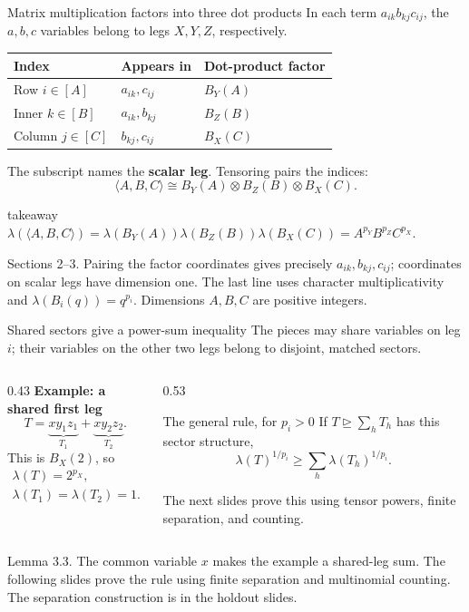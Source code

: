 \documentclass[aspectratio=169,11pt]{beamer}
\newcommand{\degen}{\unrhd}
\newcommand{\cmm}[3]{\langle #1,#2,#3\rangle}
\newcommand{\source}[1]{\vfill\par{\fontsize{7.5}{9}\selectfont\color{muted}#1\par}}
\newcommand{\takeaway}[1]{\begin{beamercolorbox}[sep=0.65em,wd=\linewidth]{takeaway}#1\end{beamercolorbox}}
\begin{document}
\begin{frame}{Matrix multiplication factors into three dot products}
  In each term $a_{ik}b_{kj}c_{ij}$, the $a,b,c$ variables belong to
  legs $X,Y,Z$, respectively.
  \begin{center}
    \renewcommand{\arraystretch}{1.15}
    \begin{tabular}{@{}lll@{}}
      \toprule
      Index & Appears in & Dot-product factor\\
      \midrule
      Row $i\in[A]$ & $a_{ik},c_{ij}$ & $B_Y(A)$\\
      Inner $k\in[B]$ & $a_{ik},b_{kj}$ & $B_Z(B)$\\
      Column $j\in[C]$ & $b_{kj},c_{ij}$ & $B_X(C)$\\
      \bottomrule
    \end{tabular}
  \end{center}
  The subscript names the \textbf{scalar leg}. Tensoring pairs the indices:
  \[
    \cmm{A}{B}{C}\cong B_Y(A)\otimes B_Z(B)\otimes B_X(C).
  \]
  \takeaway{$\displaystyle
    \lambda(\cmm{A}{B}{C})
      =\lambda(B_Y(A))\lambda(B_Z(B))\lambda(B_X(C))
      =A^{p_Y}B^{p_Z}C^{p_X}.
  $}
  \source{Sections 2--3. Pairing the factor coordinates gives precisely
  $a_{ik},b_{kj},c_{ij}$; coordinates on scalar legs have dimension one.
  The last line uses character multiplicativity and $\lambda(B_i(q))=q^{p_i}$.
  Dimensions $A,B,C$ are positive integers.}
\end{frame}

\begin{frame}{Shared sectors give a power-sum inequality}
  The pieces may share variables on leg $i$; their variables on the other
  two legs belong to disjoint, matched sectors.
  \medskip
  \begin{columns}[T,onlytextwidth]
    \begin{column}{0.43\textwidth}
      \textbf{Example: a shared first leg}
      \[
        T=\underbrace{xy_1z_1}_{T_1}
          +\underbrace{xy_2z_2}_{T_2}.
      \]
      This is $B_X(2)$, so
      \[
      \begin{gathered}
        \lambda(T)=2^{p_X},\\
        \lambda(T_1)=\lambda(T_2)=1.
      \end{gathered}
      \]
    \end{column}
    \begin{column}{0.53\textwidth}
      \begin{block}{The general rule, for $p_i>0$}
      If $T\degen\sum_h T_h$ has this sector structure,
      \[
        \lambda(T)^{1/p_i}
        \ge\sum_h\lambda(T_h)^{1/p_i}.
      \]
      \end{block}
      The next slides prove this using tensor powers, finite separation,
      and counting.
    \end{column}
  \end{columns}
  \source{Lemma 3.3. The common variable $x$ makes the example a shared-leg sum.
  The following slides prove the rule using finite separation and multinomial
  counting. The separation construction is in the holdout slides.}
\end{frame}
\end{document}
